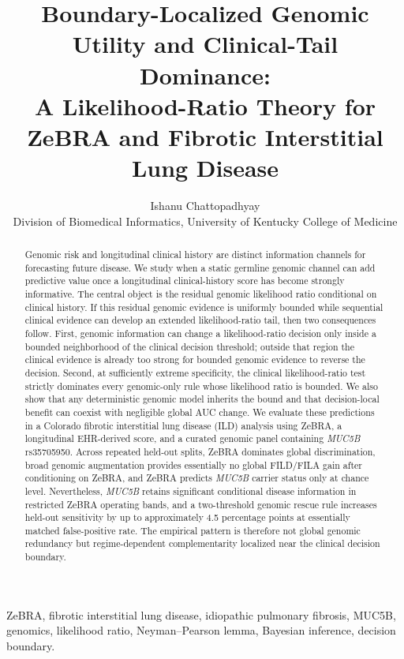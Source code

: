 \documentclass[journal]{IEEEtran}
\title{Boundary-Localized Genomic Utility and Clinical-Tail Dominance:\\
A Likelihood-Ratio Theory for ZeBRA and Fibrotic Interstitial Lung Disease}
\author{Ishanu Chattopadhyay\\
Division of Biomedical Informatics, University of Kentucky College of Medicine}
\begin{document}
\maketitle

\begin{abstract}
Genomic risk and longitudinal clinical history are distinct information channels for forecasting future disease. We study when a static germline genomic channel can add predictive value once a longitudinal clinical-history score has become strongly informative. The central object is the residual genomic likelihood ratio conditional on clinical history. If this residual genomic evidence is uniformly bounded while sequential clinical evidence can develop an extended likelihood-ratio tail, then two consequences follow. First, genomic information can change a likelihood-ratio decision only inside a bounded neighborhood of the clinical decision threshold; outside that region the clinical evidence is already too strong for bounded genomic evidence to reverse the decision. Second, at sufficiently extreme specificity, the clinical likelihood-ratio test strictly dominates every genomic-only rule whose likelihood ratio is bounded. We also show that any deterministic genomic model inherits the bound and that decision-local benefit can coexist with negligible global AUC change. We evaluate these predictions in a Colorado fibrotic interstitial lung disease (ILD) analysis using ZeBRA, a longitudinal EHR-derived score, and a curated genomic panel containing \textit{MUC5B} rs35705950. Across repeated held-out splits, ZeBRA dominates global discrimination, broad genomic augmentation provides essentially no global FILD/FILA gain after conditioning on ZeBRA, and ZeBRA predicts \textit{MUC5B} carrier status only at chance level. Nevertheless, \textit{MUC5B} retains significant conditional disease information in restricted ZeBRA operating bands, and a two-threshold genomic rescue rule increases held-out sensitivity by up to approximately 4.5 percentage points at essentially matched false-positive rate. The empirical pattern is therefore not global genomic redundancy but regime-dependent complementarity localized near the clinical decision boundary.
\end{abstract}

\begin{IEEEkeywords}
ZeBRA, fibrotic interstitial lung disease, idiopathic pulmonary fibrosis, MUC5B, genomics, likelihood ratio, Neyman--Pearson lemma, Bayesian inference, decision boundary.
\end{IEEEkeywords}
\end{document}
